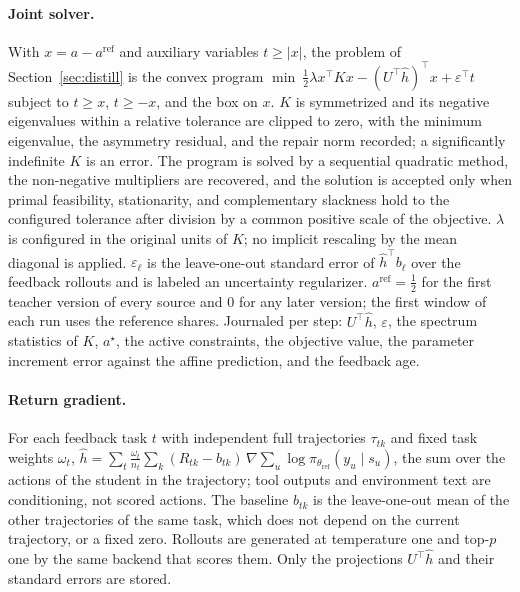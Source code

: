 \paragraph{Joint solver.}
With $x=a-a^{\mathrm{ref}}$ and auxiliary variables $t\ge|x|$, the
problem of Section~\ref{sec:distill} is the convex program
$\min\ \tfrac{1}{2}\lambda x^{\top}Kx-(U^{\top}\hat h)^{\top}x
+\varepsilon^{\top}t$ subject to $t\ge x$, $t\ge -x$, and the box on
$x$. $K$ is symmetrized and its negative eigenvalues within a relative
tolerance are clipped to zero, with the minimum eigenvalue, the
asymmetry residual, and the repair norm recorded; a significantly
indefinite $K$ is an error. The program is solved by a sequential
quadratic method, the non-negative multipliers are recovered, and the
solution is accepted only when primal feasibility, stationarity, and
complementary slackness hold to the configured tolerance after
division by a common positive scale of the objective. $\lambda$ is
configured in the original units of $K$; no implicit rescaling by the
mean diagonal is applied. $\varepsilon_\ell$ is the leave-one-out
standard error of $\hat h^{\top}b_\ell$ over the feedback rollouts and
is labeled an uncertainty regularizer. $a^{\mathrm{ref}}=\tfrac12$ for
the first teacher version of every source and $0$ for any later
version; the first window of each run uses the reference shares.
Journaled per step: $U^{\top}\hat h$, $\varepsilon$, the spectrum
statistics of $K$, $a^{\star}$, the active constraints, the objective
value, the parameter increment error against the affine prediction,
and the feedback age.

\paragraph{Return gradient.}
For each feedback task $t$ with independent full trajectories
$\tau_{tk}$ and fixed task weights $\omega_t$,
$\hat h=\sum_t\frac{\omega_t}{n_t}\sum_k(R_{tk}-b_{tk})\,\nabla\sum_{u}
\log\pi_{\theta_{\mathrm{ref}}}(y_u\mid s_u)$, the sum over the actions
of the student in the trajectory; tool outputs and environment text
are conditioning, not scored actions. The baseline $b_{tk}$ is the
leave-one-out mean of the other trajectories of the same task, which
does not depend on the current trajectory, or a fixed zero. Rollouts
are generated at temperature one and top-$p$ one by the same backend
that scores them. Only the projections $U^{\top}\hat h$ and their
standard errors are stored.

